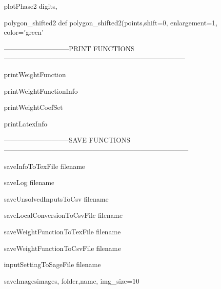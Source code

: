 \begin{method}{plotPhase2}{ digits,}

\end{method}


\begin{method}{polygon\_shifted2}{    def polygon\_shifted2(points,shift=0, enlargement=1, color='green'}

\end{method}


-----------------------------PRINT FUNCTIONS--------------------------------------------------------------------------------

\begin{method}{printWeightFunction}{}

\end{method}


\begin{method}{printWeightFunctionInfo}{}

\end{method}


\begin{method}{printWeightCoefSet}{}

\end{method}


\begin{method}{printLatexInfo}{}

\end{method}


-----------------------------SAVE FUNCTIONS---------------------------------------------------------------------------------

\begin{method}{saveInfoToTexFile}{ filename}

\end{method}


\begin{method}{saveLog}{ filename}

\end{method}


\begin{method}{saveUnsolvedInputsToCsv}{ filename}

\end{method}


\begin{method}{saveLocalConversionToCsvFile}{ filename}

\end{method}


\begin{method}{saveWeightFunctionToTexFile}{ filename}

\end{method}


\begin{method}{saveWeightFunctionToCsvFile}{ filename}

\end{method}


\begin{method}{inputSettingToSageFile}{ filename}

\end{method}


\begin{method}{saveImages}{images, folder,name, img\_size=10}

\end{method}

